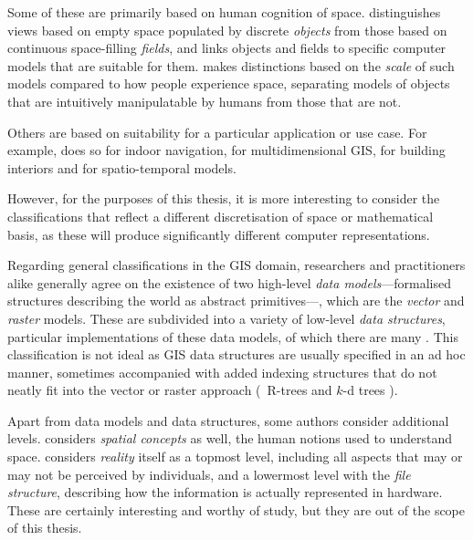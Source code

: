 Some of these are primarily based on human cognition of space.
\citet{Couclelis92} distinguishes views based on empty space populated by discrete \emph{objects} from those based on continuous space-filling \emph{fields}, and \citet{Goodchild92} links objects and fields to specific computer models that are suitable for them.
\citet{Freundschuh97} makes distinctions based on the \emph{scale} of such models compared to how people experience space, separating models of objects that are intuitively manipulatable by humans from those that are not.

Others are based on suitability for a particular application or use case.
For example, \citet{Afyouni11} does so for indoor navigation, \citet{Gold05} for multidimensional GIS, \citet{Dominguez11} for building interiors and \citet{Pelekis04} for spatio-temporal models.

However, for the purposes of this thesis, it is more interesting to consider the classifications that reflect a different discretisation of space or mathematical basis, as these will produce significantly different computer representations.

Regarding general classifications in the GIS domain, researchers and practitioners alike generally agree on the existence of two high-level \emph{data models}---formalised structures describing the world as abstract primitives---, which are the \emph{vector} and \emph{raster} models. 
These are subdivided into a variety of low-level \emph{data structures}, particular implementations of these data models, of which there are many \citep{vanKreveld97a}.
This classification is not ideal as GIS data structures are usually specified in an ad hoc manner, sometimes accompanied with added indexing structures that do not neatly fit into the vector or raster approach (\eg\ R-trees \citep{Guttman84} and $k$-d trees \citep{Bentley75}).

Apart from data models and data structures, some authors consider additional levels.
\citet{Frank92} considers \emph{spatial concepts} as well, the human notions used to understand space.
\citet{Peuquet84} considers \emph{reality} itself as a topmost level, including all aspects that may or may not be perceived by individuals, and a lowermost level with the \emph{file structure}, describing how the information is actually represented in hardware.
These are certainly interesting and worthy of study, but they are out of the scope of this thesis.

